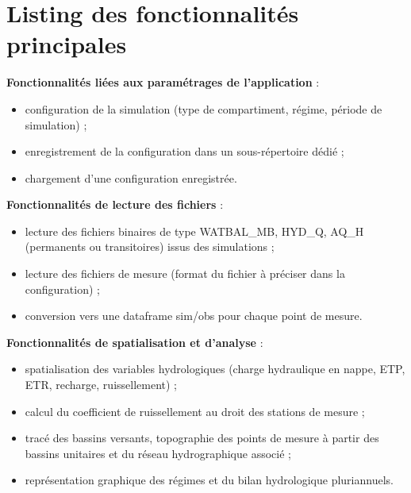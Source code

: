 \documentclass[11pt,french]{book}
\begin{document}
\frontmatter
\dominitoc%

\mainmatter%

\section{Listing des fonctionnalités principales} 
\textbf{Fonctionnalités liées aux paramétrages de l'application} : 
\begin{itemize}
    \item configuration de la simulation (type de compartiment, régime, période de simulation) ;
    \item enregistrement de la configuration dans un sous-répertoire dédié ;
    \item chargement d'une configuration enregistrée.\\
\end{itemize}

\textbf{Fonctionnalités de lecture des fichiers} : 
\begin{itemize}
    \item lecture des fichiers binaires de type WATBAL\_MB, HYD\_Q, AQ\_H (permanents ou transitoires) issus des simulations ;
    \item lecture des fichiers de mesure (format du fichier à préciser dans la configuration) ;
    \item conversion vers une dataframe sim/obs pour chaque point de mesure. \\
\end{itemize}

\textbf{Fonctionnalités de spatialisation et d'analyse} : 
\begin{itemize}
    \item spatialisation des variables hydrologiques (charge hydraulique en nappe, ETP, ETR, recharge, ruissellement) ;
    \item calcul du coefficient de ruissellement au droit des stations de mesure ;
    \item tracé des bassins versants, topographie des points de mesure à partir des bassins unitaires et du réseau hydrographique associé ;
    \item représentation graphique des régimes et du bilan hydrologique pluriannuels. \\
\end{itemize}
\end{document}
